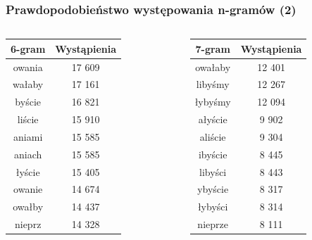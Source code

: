 \documentclass[10pt,a4paper]{beamer}
\begin{document}
\begin{frame}
	\frametitle{Prawdopodobieństwo występowania n-gramów (2)}
	
	\begin{columns}
		\begin{column}{.5\textwidth}
				\begin{tabular}{|c|c|}
					\hline
					6-gram	&	Wystąpienia	\\
					\hline
					owania	&	17 609	\\
					wałaby	&	17 161	\\
					byście	&	16 821	\\
					liście		&	15 910	\\
					aniami	&	15 585	\\
					aniach	&	15 585	\\
					łyście	&	15 405	\\
					owanie	&	14 674	\\
					owałby	&	14 437	\\
					nieprz	&	14 328	\\
					\hline
				\end{tabular}
		\end{column}
		
		\begin{column}{.5\textwidth}
				\begin{tabular}{|c|c|}
					\hline
					7-gram	&	Wystąpienia	\\
					\hline
					owałaby	&	12 401		\\
					libyśmy		&	12 267		\\
					łybyśmy	&	12 094		\\
					ałyście		&	9 902		\\
					aliście		&	9 304		\\
					ibyście		&	8 445		\\
					libyści		&	8 443		\\
					ybyście		&	8 317		\\
					łybyści		&	8 314		\\
					nieprze		&	8 111		\\
					\hline
				\end{tabular}
		\end{column}
	\end{columns}
\end{frame}
\end{document}
